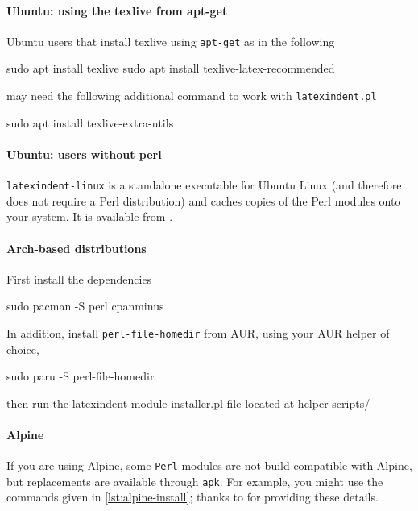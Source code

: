   \paragraph{Ubuntu: using the texlive from apt-get}
   Ubuntu users that install texlive using \texttt{apt-get} as in the following

   \begin{commandshell}
sudo apt install texlive
sudo apt install texlive-latex-recommended
\end{commandshell}

   may need the following additional command to work with \texttt{latexindent.pl}

   \begin{commandshell}
sudo apt install texlive-extra-utils 
\end{commandshell}

  \paragraph{Ubuntu: users without perl}

   \texttt{latexindent-linux} is a standalone executable  for Ubuntu Linux (and therefore does not require a Perl distribution)
   and caches copies of the Perl modules onto your system. It is available from \cite{latexindent-home}.
     

  \paragraph{Arch-based distributions}
   First install the dependencies

   \begin{commandshell}
sudo pacman -S perl cpanminus
\end{commandshell}

   In addition, install \texttt{perl-file-homedir} from AUR, using your AUR helper of
   choice,

   \begin{commandshell}
sudo paru -S perl-file-homedir
\end{commandshell}

   then run the latexindent-module-installer.pl file located at helper-scripts/

  \paragraph{Alpine}
   If you are using Alpine, some \texttt{Perl} modules are not build-compatible with
   Alpine, but replacements are available through \texttt{apk}. For example, you might
   use the commands given in \cref{lst:alpine-install}; thanks to \cite{jun-sheaf} for
   providing these details.


